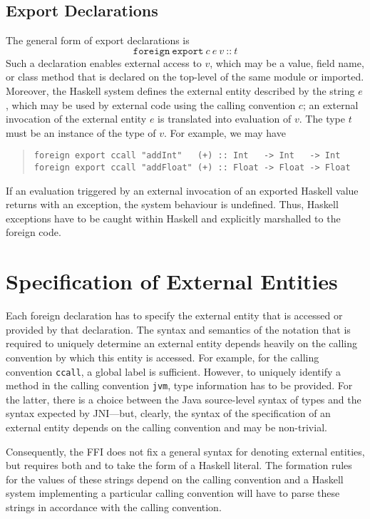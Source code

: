 \documentclass[a4paper,twoside]{article}
\newcommand{\code}[1]{\texttt{#1}}      %
\begin{document}
\subsection{Export Declarations}

The general form of export declarations is
%
\[
\code{foreign}~\code{export}~c~e~v~\code{{::}}~t
\]
%
Such a declaration enables external access to $v$, which may be a value, field
name, or class method that is declared on the top-level of the same module or
imported.  Moreover, the Haskell system defines the external entity described
by the string $e$, which may be used by external code using the calling
convention $c$; an external invocation of the external entity $e$ is
translated into evaluation of $v$.  The type $t$ must be an instance of the
type of $v$.  For example, we may have
%
\begin{quote}
\begin{verbatim}
foreign export ccall "addInt"   (+) :: Int   -> Int   -> Int
foreign export ccall "addFloat" (+) :: Float -> Float -> Float
\end{verbatim}
\end{quote}

If an evaluation triggered by an external invocation of an exported Haskell
value returns with an exception, the system behaviour is undefined.  Thus,
Haskell exceptions have to be caught within Haskell and explicitly marshalled
to the foreign code.


\section{Specification of External Entities}
\label{sec:extent}

Each foreign declaration has to specify the external entity that is accessed
or provided by that declaration.  The syntax and semantics of the notation
that is required to uniquely determine an external entity depends heavily on
the calling convention by which this entity is accessed.  For example, for the
calling convention \code{ccall}, a global label is sufficient.  However, to
uniquely identify a method in the calling convention \code{jvm}, type
information has to be provided.  For the latter, there is a choice between the
Java source-level syntax of types and the syntax expected by JNI---but,
clearly, the syntax of the specification of an external entity depends on the
calling convention and may be non-trivial.

Consequently, the FFI does not fix a general syntax for denoting external
entities, but requires both  and  to take the
form of a Haskell  literal.  The formation rules for the values
of these strings depend on the calling convention and a Haskell system
implementing a particular calling convention will have to parse these strings
in accordance with the calling convention.
\end{document}
